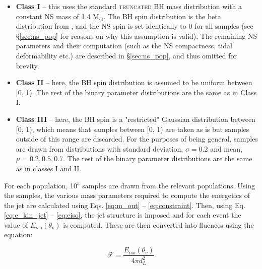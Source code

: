     \begin{itemize}

        \item \textbf{Class I} -- this uses the standard \textsc{truncated} BH mass
            distribution with a constant NS mass of 1.4 M$_\odot$. The BH spin
            distribution is the beta distribution from \cite{abbott_2020B}, and the NS
            spin is set identically to 0 for all samples (see \S\ref{sec:ns_pop}
            for reasons on why this assumption is valid). The remaining NS parameters
            and their computation (such as the NS compactness, tidal deformability etc.)
            are described in \S\ref{sec:ns_pop}, and thus omitted for brevity.

        \item \textbf{Class II} -- here, the BH spin distribution is assumed to be
            uniform between [0, 1). The rest of the binary parameter distributions are
            the same as in Class I.

        \item \textbf{Class III} -- here, the BH spin is a "restricted" Gaussian
            distribution between [0, 1), which means that samples between [0, 1) are
            taken as is but samples outside of this range are discarded.  For the
            purposes of being general, samples are drawn from distributions with
            standard deviation, $\sigma = 0.2$ and mean, $\mu = 0.2, 0.5, 0.7$.  The
            rest of the binary parameter distributions are the same as in classes I and
            II.

    \end{itemize}

    For each population, 10$^5$ samples are drawn from the relevant populations. Using
    the samples, the various mass parameters required to compute the energetics of the
    jet are calculated using Eqs. \ref{eq:m_out} -- \ref{eq:constraint}. Then, using Eq.
    \ref{eq:e_kin_jet} -- \ref{eq:eiso}, the jet structure is imposed and for each event
    the value of $E_{iso}(\theta_v)$ is computed. These are then converted into fluences
    using the equation:

    \begin{equation}
        \mathcal{F} = \dfrac{E_{iso}(\theta_v)}{4\pi d_L^2}
        \label{eq:fluence}
    \end{equation}

